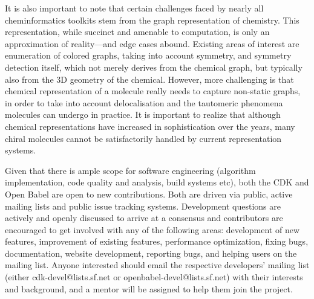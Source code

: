 \documentclass{sig-alternate}
\begin{document}
It is also important to note that certain challenges faced by nearly
all cheminformatics toolkits stem from the graph representation of
chemistry. This representation, while succinct and amenable to
computation, is only an approximation of reality---and edge cases
abound. Existing areas of interest are enumeration of colored graphs,
taking into account symmetry, and symmetry detection itself, which not
merely derives from the chemical graph, but typically also from the 3D
geometry of the chemical. However, more challenging is that chemical
representation of a molecule really needs to capture non-static
graphs, in order to take into account delocalisation and the tautomeric
phenomena molecules can undergo in practice. It is important to
realize that although chemical representations have increased in
sophistication over the years, many chiral molecules cannot be
satisfactorily handled by current representation systems.


Given that there is ample scope for software engineering (algorithm
implementation, code quality and analysis, build systems etc), both
the CDK and Open Babel are open to new contributions. Both are driven
via public, active mailing lists and public issue tracking systems.
Development questions are actively and openly discussed to arrive at a
consensus and contributors are encouraged to get involved with any of
the following areas: development of new features, improvement of
existing features, performance optimization, fixing bugs,
documentation, website development, reporting bugs, and helping users
on the mailing list. Anyone interested should email the respective
developers' mailing list (either cdk-devel@lists.sf.net or
openbabel-devel@lists.sf.net) with their interests and background, and
a mentor will be assigned to help them join the project.
\end{document}
